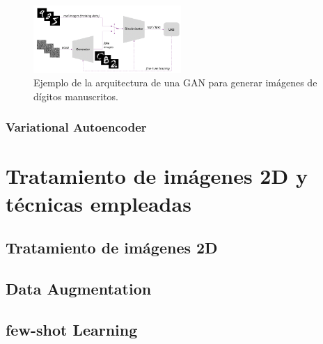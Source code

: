             \begin{figure}[!h]
                \centering
                \includegraphics[width=0.5\textwidth]{img/GAN.png}
                \caption{Ejemplo de la arquitectura de una GAN para generar imágenes de dígitos manuscritos.}
                \label{fig:GAN}
            \end{figure}
 
        \subsubsection{Variational Autoencoder}

\section{Tratamiento de imágenes 2D y técnicas empleadas}
    \subsection{Tratamiento de imágenes 2D}

    \subsection{Data Augmentation} \label{sub:data_augmentation}

    \subsection{few-shot Learning}

\endinput

